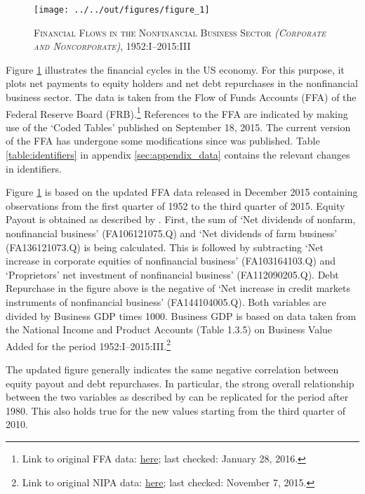 \begin{figure}
    
    \centering

    \texttt{[image: ../../out/figures/figure\_1]}

    \caption{\textsc{Financial Flows in the Nonfinancial Business Sector \textit{(Corporate and Noncorporate)}}, 1952:I--2015:III}
    
    \label{fig:figure_1}

\end{figure}


Figure \ref{fig:figure_1} illustrates the financial cycles in the US economy. For this purpose, it plots net payments to equity holders and net debt repurchases in the nonfinancial business sector. The data is taken from the Flow of Funds Accounts (FFA) of the Federal Reserve Board (FRB).\footnote{Link to original FFA data: \href{http://www.federalreserve.gov/datadownload/Download.aspx?rel=Z1&series=1f08e962a27dff21b89a7212d58b8346&filetype=spreadsheetml&label=include&layout=seriescolumn&from=03/01/1952&to=09/30/2015}{here}; last checked: January 28, 2016.}
References to the FFA are indicated by making use of the ‘Coded Tables’ published on September 18, 2015. The current version of the FFA has undergone some modifications since \citet{JERMANNfinancial} was published. 
Table \ref{table:identifiers} in appendix \ref{sec:appendix_data} contains the relevant changes in identifiers.

Figure \ref{fig:figure_1} is based on the updated FFA data released in December 2015 containing observations from the first quarter of 1952 to the third quarter of 2015. Equity Payout is obtained as described by \citeauthor{JERMANNfinancial}. First, the sum of ‘Net dividends of nonfarm, nonfinancial business’ (FA106121075.Q) and ‘Net dividends of farm business’ (FA136121073.Q) is being calculated. This is followed by subtracting ‘Net increase in corporate equities of nonfinancial business’ (FA103164103.Q) and ‘Proprietors’ net investment of nonfinancial business’ (FA112090205.Q). Debt Repurchase in the figure above is the negative of ‘Net increase in credit markets instruments of nonfinancial business’ (FA144104005.Q). 
Both variables are divided by Business GDP times 1000. Business GDP is based on data taken from the National Income and Product Accounts (Table 1.3.5) on Business Value Added for the period 1952:I--2015:III.\footnote{Link to original NIPA data: \href{http://www.bea.gov//national/nipaweb/DownSS2.asp}{here}; last checked: November 7, 2015.} 

The updated figure generally indicates the same negative correlation between equity payout and debt repurchases. In particular, the strong overall relationship between the two variables as described by \citeauthor{JERMANNfinancial} can be replicated for the period after 1980. This also holds true for the new values starting from the third quarter of 2010. 

